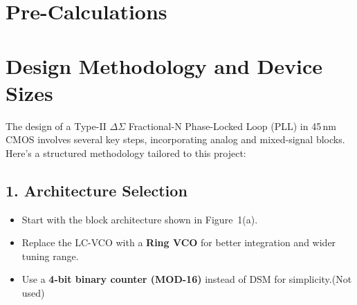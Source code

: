 \section{Pre-Calculations}

\section*{Design Methodology and Device Sizes}

The design of a Type-II $\Delta\Sigma$ Fractional-N Phase-Locked Loop (PLL) in 45\,nm CMOS involves several key steps, incorporating analog and mixed-signal blocks. Here's a structured methodology tailored to this project:

\subsection*{1. Architecture Selection}
\begin{itemize}
    \item Start with the block architecture shown in Figure~1(a).
    \item Replace the LC-VCO with a \textbf{Ring VCO} for better integration and wider tuning range.
    \item Use a \textbf{4-bit binary counter (MOD-16)} instead of DSM for simplicity.(Not used)
\end{itemize}

